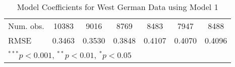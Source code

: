 \begin{table}
\begin{center}
\begin{small}
\begin{tabular}{l c c c c c c }
Num. obs.       & 10383           & 9016            & 8769            & 8483            & 7947            & 8488            \\
RMSE            & 0.3463          & 0.3530          & 0.3848          & 0.4107          & 0.4070          & 0.4096          \\
\hline
\multicolumn{7}{l}{\tiny{$^{***}p<0.001$, $^{**}p<0.01$, $^*p<0.05$}}
\end{tabular}
\end{small}
\caption{Model Coefficients for West German Data using Model 1}
\label{table:WestModelsTotal}
\end{center}
\end{table}
